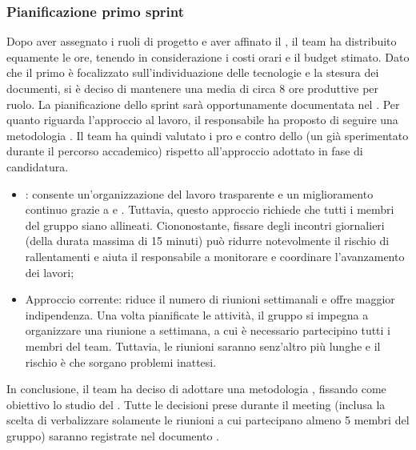 \subsubsection{Pianificazione primo sprint}
\par Dopo aver assegnato i ruoli di progetto e aver affinato il \glossario{\WoW}, il team ha distribuito equamente le ore, tenendo in considerazione i costi orari e il budget stimato. Dato che il primo  è focalizzato sull'individuazione delle tecnologie e la stesura dei documenti, si è deciso di mantenere una media di circa 8 ore produttive per ruolo. La pianificazione dello sprint sarà opportunamente documentata nel \PdP. Per quanto riguarda l'approccio al lavoro, il responsabile ha proposto di seguire una metodologia . Il team ha quindi valutato i pro e contro dello  (un  già sperimentato durante il percorso accademico) rispetto all'approccio adottato in fase di candidatura.
\begin{itemize}
	\item {}: consente un'organizzazione del lavoro trasparente e un miglioramento continuo grazie a  e . Tuttavia, questo approccio richiede che tutti i membri del gruppo siano allineati. Ciononostante, fissare degli incontri giornalieri (della durata massima di 15 minuti) può ridurre notevolmente il rischio di rallentamenti e aiuta il responsabile a monitorare e coordinare l'avanzamento dei lavori;
	\item Approccio corrente: riduce il numero di riunioni settimanali e offre maggior indipendenza. Una volta pianificate le attività, il gruppo si impegna a organizzare una riunione a settimana, a cui è necessario partecipino tutti i membri del team. Tuttavia, le riunioni saranno senz'altro più lunghe e il rischio è che sorgano problemi inattesi.
\end{itemize}

\vspace{0.5\baselineskip}
\par In conclusione, il team ha deciso di adottare una metodologia , fissando come obiettivo lo studio del  . Tutte le decisioni prese durante il meeting (inclusa la scelta di verbalizzare solamente le riunioni a cui partecipano almeno 5 membri del gruppo) saranno registrate nel documento \NdP.
